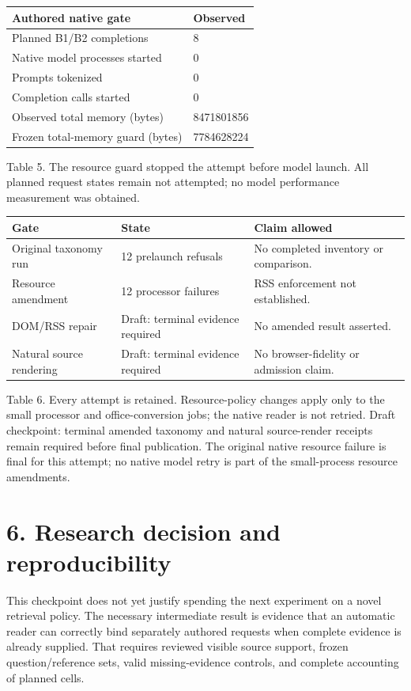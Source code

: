 \documentclass[10pt,a4paper]{article}
\begin{document}
\begin{longtable}{@{}p{}p{}@{}}\toprule
\textbf{Authored native gate} & \textbf{Observed} \\ \midrule\endhead
Planned B1/B2 completions & 8 \\
Native model processes started & 0 \\
Prompts tokenized & 0 \\
Completion calls started & 0 \\
Observed total memory (bytes) & 8471801856 \\
Frozen total-memory guard (bytes) & 7784628224 \\
\bottomrule\end{longtable}
{\small Table 5. The resource guard stopped the attempt before model launch. All planned request states remain not attempted; no model performance measurement was obtained.}
\begin{longtable}{@{}p{}p{}p{}@{}}\toprule
\textbf{Gate} & \textbf{State} & \textbf{Claim allowed} \\ \midrule\endhead
Original taxonomy run & 12 prelaunch refusals & No completed inventory or comparison. \\
Resource amendment & 12 processor failures & RSS enforcement not established. \\
DOM/RSS repair & Draft: terminal evidence required & No amended result asserted. \\
Natural source rendering & Draft: terminal evidence required & No browser-fidelity or admission claim. \\
\bottomrule\end{longtable}
{\small Table 6. Every attempt is retained. Resource-policy changes apply only to the small processor and office-conversion jobs; the native reader is not retried.}
Draft checkpoint: terminal amended taxonomy and natural source-render receipts remain required before final publication. The original native resource failure is final for this attempt; no native model retry is part of the small-process resource amendments.

\clearpage
\section*{6. Research decision and reproducibility}
This checkpoint does not yet justify spending the next experiment on a novel retrieval policy. The necessary intermediate result is evidence that an automatic reader can correctly bind separately authored requests when complete evidence is already supplied. That requires reviewed visible source support, frozen question/reference sets, valid missing-evidence controls, and complete accounting of planned cells.
\end{document}
